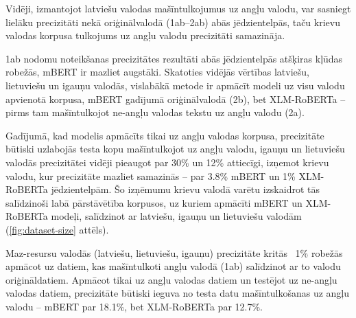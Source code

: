 

Vidēji, izmantojot latviešu valodas mašīntulkojumus uz angļu valodu, var sasniegt lielāku precizitāti nekā oriģinālvalodā (1ab--2ab) abās jēdzientelpās, taču krievu valodas korpusa tulkojums uz angļu valodu precizitāti samazināja. 


1ab nodomu noteikšanas precizitātes rezultāti abās jēdzientelpās atšķiras kļūdas robežās, mBERT ir mazliet augstāki. Skatoties vidējās vērtības latviešu, lietuviešu un igauņu valodās, vislabākā metode ir apmācīt modeli uz visu valodu apvienotā korpusa, mBERT gadījumā oriģinālvalodā (2b), bet XLM-RoBERTa -- pirms tam mašīntulkojot ne-angļu valodas tekstu uz angļu valodu (2a).



Gadījumā, kad modelis apmācīts tikai uz angļu valodas korpusa, precizitāte būtiski uzlabojās testa kopu mašīntulkojot uz angļu valodu, igauņu un lietuviešu valodās precizitātei vidēji pieaugot par 30\% un 12\% attiecīgi, izņemot krievu valodu, kur precizitāte mazliet samazinās -- par 3.8\% mBERT un 1\% XLM-RoBERTa jēdzientelpām. Šo izņēmumu krievu valodā varētu izskaidrot tās salīdzinoši labā pārstāvētība korpusos, uz kuriem apmācīti mBERT un XLM-RoBERTa modeļi, salīdzinot ar latviešu, igauņu un lietuviešu valodām (\ref{fig:dataset-size} attēls).



Maz-resursu valodās (latviešu, lietuviešu, igauņu) precizitāte kritās ~1\% robežās apmācot uz datiem, kas mašīntulkoti angļu valodā (1ab) salīdzinot ar to valodu oriģināldatiem. Apmācot tikai uz angļu valodas datiem un testējot uz ne-angļu valodas datiem, precizitāte būtiski ieguva no testa datu mašīntulkošanas uz angļu valodu -- mBERT par
18.1\%, bet XLM-RoBERTa par
12.7\%.



